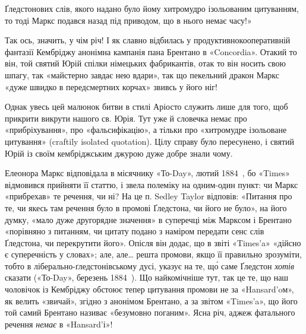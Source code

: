\parcont{}  %
Ґледстонових слів, якого надано було йому хитромудро ізольованим цитуванням, то тоді Маркс подався
назад під приводом, що в нього немає часу!»

Так ось, значить, у чім річ! І як славно відбилась у продуктивно\dash{}кооперативній
фантазії Кембріджу анонімна кампанія пана Брентано в «Concordia». Отакий то він, той святий Юрій
спілки німецьких фабрикантів, отак то він носить свою шпагу, так «майстерно завдає нею вдари», так
що пекельний дракон Маркс «дуже швидко в передсмертних корчах» звивсь у його ніг!

Однак увесь цей малюнок битви в стилі Аріосто служить лише для того, щоб прикрити викрути нашого св.
Юрія. Тут уже й словечка немає про «прибріхування», про «фальсифікацію», а тільки про «хитромудре
ізольоване цитування» (craftily
isolated quotation). Цілу справу було пересунено, і святий Юрій із своїм кембріджським джурою дуже
добре знали чому.

Елеонора Маркс відповідала в місячнику «То-Day», лютий 1884~, бо «Ti\-mes» відмовився прийняти її
статтю, і звела полеміку на одним-один пункт: чи Маркс «прибрехав» те речення, чи ні? На це п.
Sedley Taylor відповів: «Питання про те, чи
якесь там речення було в промові Ґледстона, чи його не було», на його думку, «мало дуже другорядне
значення» в суперечці між Марксом і Брентано «порівняно з питанням, чи цитату подано з наміром
передати сенс слів Ґледстона, чи перекрутити
його». Опісля він додає, що в звіті «Times’a» «дійсно є суперечність у словах»; але, але\dots{} решта
промови, якщо її правильно зрозуміти, тобто в ліберально-ґледстонівському дусі, указує на те, щ\'{о}
саме Ґледстон \emph{хотів} сказати («То-Day», березень 1884~). Що найкомічніше тут, так це те, що наш
чоловічок із Кембріджу обстоює тепер цитування промови не за «Hansard’oм», як велить «звичай»,
згідно з анонімом Брентано, а за звітом «Times’a», що його той самий Брентано називає «безумовно
поганим». Ясна річ, аджеж фатального речення \emph{немає} в «Hansard’і»!


